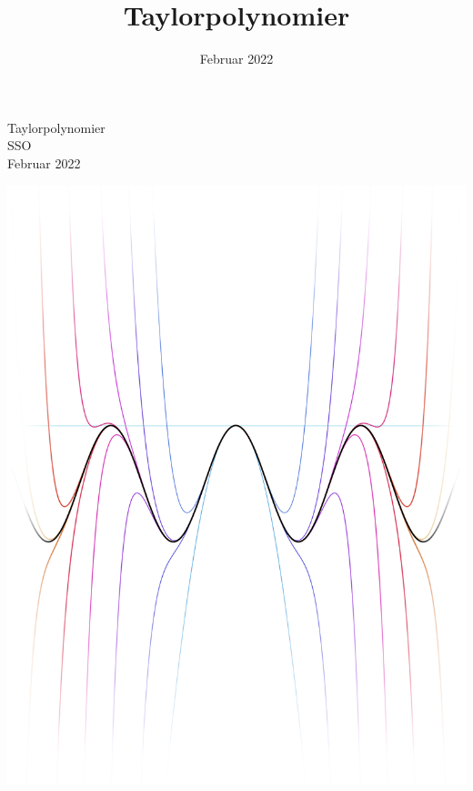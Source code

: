 \documentclass[12pt, a4paper]{article}
\title{Taylorpolynomier}
\date{Februar 2022}
\begin{document}
\begin{titlepage}
   \centering
    \vfill
    {\huge 
    Taylorpolynomier\\
    \vspace{0.5cm}
    \large
    SSO\\
    \vspace{0.25cm}
    Februar 2022
    }    
    \vfill
   
    \includegraphics[width=\textwidth]{figures/forside4edit.png} %
    \vfill
    \vfill
\thispagestyle{empty}

\end{titlepage}
\setcounter{page}{2}
\end{document}
